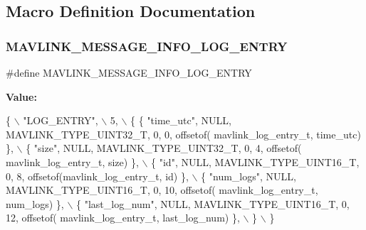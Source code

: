 \subsection{Macro Definition Documentation}
\mbox{\label{mavlink__msg__log__entry_8h_ab8a2fd14b7dd191c83afda1d5d20ba03}} 
\subsubsection{M\+A\+V\+L\+I\+N\+K\+\_\+\+M\+E\+S\+S\+A\+G\+E\+\_\+\+I\+N\+F\+O\+\_\+\+L\+O\+G\+\_\+\+E\+N\+T\+RY}
{\footnotesize\ttfamily \#define M\+A\+V\+L\+I\+N\+K\+\_\+\+M\+E\+S\+S\+A\+G\+E\+\_\+\+I\+N\+F\+O\+\_\+\+L\+O\+G\+\_\+\+E\+N\+T\+RY}

{\bfseries Value\+:}
\begin{DoxyCode}
\{ \(\backslash\)
    \textcolor{stringliteral}{"LOG\_ENTRY"}, \(\backslash\)
    5, \(\backslash\)
    \{  \{ \textcolor{stringliteral}{"time\_utc"}, NULL, MAVLINK_TYPE_UINT32_T, 0, 0, offsetof(
      mavlink_log_entry_t, time\_utc) \}, \(\backslash\)
         \{ \textcolor{stringliteral}{"size"}, NULL, MAVLINK_TYPE_UINT32_T, 0, 4, offsetof(
      mavlink_log_entry_t, size) \}, \(\backslash\)
         \{ \textcolor{stringliteral}{"id"}, NULL, MAVLINK_TYPE_UINT16_T, 0, 8, offsetof(mavlink_log_entry_t, \textcolor{keywordtype}{id}) \}, \(\backslash\)
         \{ \textcolor{stringliteral}{"num\_logs"}, NULL, MAVLINK_TYPE_UINT16_T, 0, 10, offsetof(
      mavlink_log_entry_t, num\_logs) \}, \(\backslash\)
         \{ \textcolor{stringliteral}{"last\_log\_num"}, NULL, MAVLINK_TYPE_UINT16_T, 0, 12, offsetof(
      mavlink_log_entry_t, last\_log\_num) \}, \(\backslash\)
         \} \(\backslash\)
\}
\end{DoxyCode}
\mbox{\label{mavlink__msg__log__entry_8h_abc6952f78dcb8339361cace0cd6b7b35}} 
